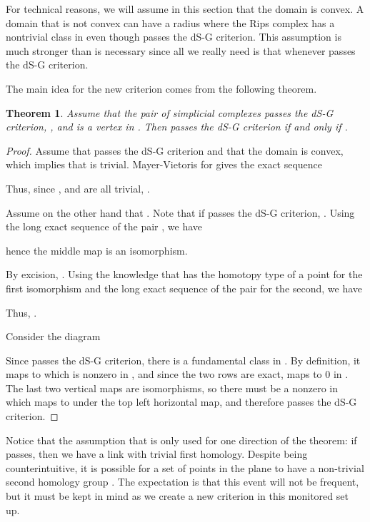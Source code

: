 \documentclass[10pt,twocolumn]{article} \usepackage{amsmath,epsf,amssymb,cite,pifont,amsthm, mathrsfs,epsfig,  bbm, amsthm,  setspace}
\newtheorem{thm}{Theorem}
\renewcommand{\1}{\mathbbm{1}}
\begin{document}
For technical reasons, we will assume  in this section  that the domain is convex.
A domain that is not convex can have a radius where the Rips complex has a nontrivial class in  even though  passes the dS-G criterion.
This assumption is much stronger than is necessary since all we really need
is  that  whenever  passes the dS-G criterion.



The main idea for the new criterion comes from the following theorem.
\begin{thm}\label{Thm: New Criterion}
 Assume that the pair of simplicial complexes  passes the dS-G criterion, , and  is a vertex in .
Then  passes the dS-G criterion if and only if .
\end{thm}

\begin{proof}
Assume that  passes the dS-G criterion and that the domain is convex, which
implies that  is trivial.
Mayer-Vietoris  for  gives the exact sequence

Thus, since ,  and  are all  trivial,  .

Assume on the other hand that .
Note that if  passes the dS-G criterion, .
Using the long exact sequence of the pair , we have

hence the middle map is an isomorphism.



By excision, .
Using the knowledge that  has the homotopy type of a point for the first isomorphism and the long exact sequence of the pair  for the second, we have

Thus, .

Consider the diagram

Since  passes the dS-G criterion, there is a fundamental class  in .
By definition, it maps to  which is nonzero in , and since the two rows are exact,  maps to 0 in .
The last two vertical maps are isomorphisms, so there must be a nonzero  in  which maps to  under the top left horizontal map, and therefore  passes the dS-G criterion.


\end{proof}

Notice that the assumption that  is only used  for one direction of the theorem: if  passes, then we have a link with trivial first homology.
Despite being counterintuitive, it is possible for a set of points in the plane to have a non-trivial second homology group \cite{Chambers2009}.
The expectation is that this event will not be frequent, but it must be kept in mind as we create a new criterion in this monitored set up.
\end{document}
